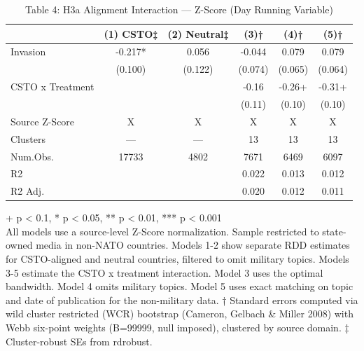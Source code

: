\begin{table}[t]
\caption{\label{tab:table-04}Table 4: H3a Alignment Interaction — Z-Score (Day Running Variable)} 
\fontsize{12.0pt}{14.0pt}\selectfont
\begin{tabular*}{\linewidth}{@{\extracolsep{\fill}}lccccc}
\toprule
  & (1) CSTO‡ & (2) Neutral‡ & (3)† & (4)† & (5)† \\ 
\midrule\addlinespace[2.5pt]
Invasion & -0.217* & 0.056 & -0.044 & 0.079 & 0.079 \\ 
 & (0.100) & (0.122) & (0.074) & (0.065) & (0.064) \\ 
CSTO x Treatment &  &  & -0.16 & -0.26+ & -0.31+ \\ 
{} & {} & {} & {(0.11)} & {(0.10)} & {(0.10)} \\ 
Source Z-Score & X & X & X & X & X \\ 
Clusters & — & — & 13 & 13 & 13 \\ 
Num.Obs. & 17733 & 4802 & 7671 & 6469 & 6097 \\ 
R2 &  &  & 0.022 & 0.013 & 0.012 \\ 
R2 Adj. &  &  & 0.020 & 0.012 & 0.011 \\ 
\bottomrule
\end{tabular*}
\begin{minipage}{\linewidth}
\vspace{.05em}
+ p < 0.1, * p < 0.05, ** p < 0.01, *** p < 0.001\\
All models use a source-level Z-Score normalization. Sample restricted to
state-owned media in non-NATO countries. Models 1-2 show separate RDD estimates
for CSTO-aligned and neutral countries, filtered to omit military topics.
Models 3-5 estimate the CSTO x treatment interaction. Model 3 uses the optimal
bandwidth. Model 4 omits military topics. Model 5 uses exact matching on topic
and date of publication for the non-military data. † Standard errors computed
via wild cluster restricted (WCR) bootstrap (Cameron, Gelbach \& Miller 2008)
with Webb six-point weights (B=99999, null imposed), clustered by source domain.
‡ Cluster-robust SEs from rdrobust.\\
\end{minipage}
\end{table}


